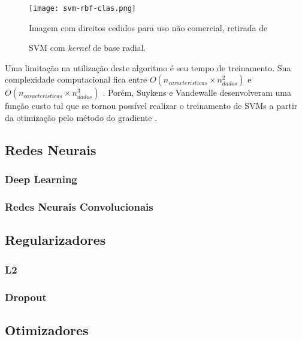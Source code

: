 \begin{figure}
\begin{center} {
    \begin{center}
    \texttt{[image: svm-rbf-clas.png]}
    \caption{SVM com \textit{kernel} de base radial.}
    \small Imagem com direitos cedidos para uso não comercial, retirada de \cite{vanderplas15}
    \label{fig:svm-rbf-clas}
    \end{center}
}
\end{center}
\end{figure}

Uma limitação na utilização deste algoritmo é seu tempo de treinamento. Sua complexidade computacional fica entre $O(n_{caracteristicas} \times n_{dados}^2)$ e $O(n_{caracteristicas} \times n_{dados}^3)$ \cite{list09}. Porém, Suykens e Vandewalle desenvolveram uma função custo tal que se tornou possível realizar o treinamento de SVMs a partir da otimização pelo método do gradiente \cite{suykens99}.

\subsection{Redes Neurais}

\subsubsection{Deep Learning}

\subsubsection{Redes Neurais Convolucionais}

\subsection{Regularizadores}

\subsubsection{L2}

\subsubsection{Dropout}

\subsection{Otimizadores}

